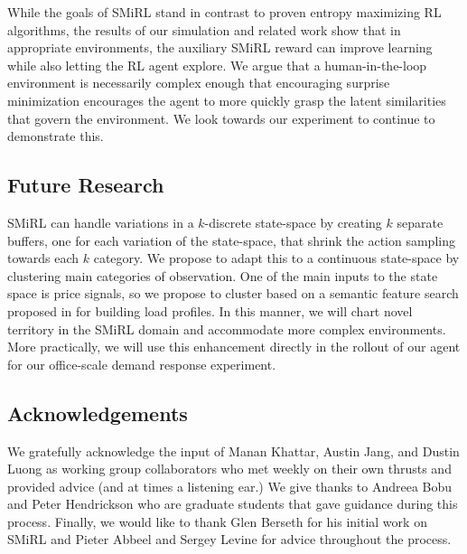 
While the goals of SMiRL stand in contrast to proven entropy maximizing RL algorithms, the results of our simulation and related work show that in appropriate environments, the 
auxiliary SMiRL reward can improve learning while also letting the RL agent explore. We argue that a human-in-the-loop environment is necessarily complex enough that encouraging surprise minimization encourages the agent to more quickly grasp the latent similarities that govern the environment. We look towards our experiment to continue to demonstrate this. 

\subsection{Future Research}
SMiRL can handle variations in a $k$-discrete state-space by creating $k$ separate buffers, one for each variation of the state-space, that shrink the action sampling towards each $k$ category. We propose to adapt this to a continuous state-space by clustering main categories of observation. One of the main inputs to the state space is price signals, so we propose to cluster based on a semantic feature search proposed in \citep{afzalan2019semantic} for building load profiles. In this manner, we will chart novel territory in the SMiRL domain and accommodate more complex environments. 
More practically, we will use this enhancement directly in the rollout of our agent for our office-scale demand response experiment. 


\subsection{Acknowledgements}
We gratefully acknowledge the input of Manan Khattar, Austin Jang, and Dustin Luong as working group collaborators who met weekly on their own thrusts and provided advice (and at times a listening ear.) We give thanks to Andreea Bobu and Peter Hendrickson who are graduate students that gave guidance during this process. Finally, we would like to thank Glen Berseth for his initial work on SMiRL and Pieter Abbeel and Sergey Levine for advice throughout the process.  
